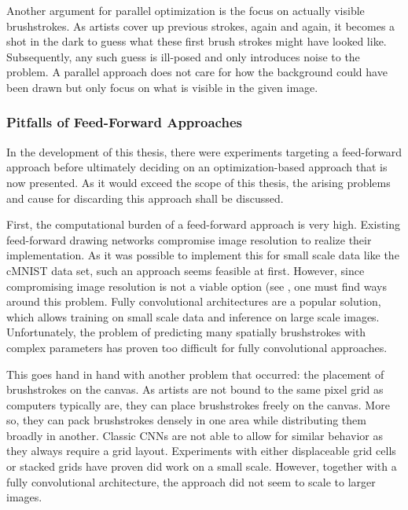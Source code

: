 Another argument for parallel optimization is the focus on actually visible brushstrokes.
As artists cover up previous strokes, again and again, it becomes a shot in the dark to guess what these first brush strokes might have looked like.
Subsequently, any such guess is ill-posed and only introduces noise to the problem.
A parallel approach does not care for how the background could have been drawn but only focus on what is visible in the given image.

\subsubsection{Pitfalls of Feed-Forward Approaches}

In the development of this thesis, there were experiments targeting a feed-forward approach before ultimately deciding on an optimization-based approach that is now presented.
As it would exceed the scope of this thesis, the arising problems and cause for discarding this approach shall be discussed.

First, the computational burden of a feed-forward approach is very high.
Existing feed-forward drawing networks compromise image resolution to realize their implementation.
As it was possible to implement this for small scale data like the cMNIST data set, such an approach seems feasible at first.  
However, since compromising image resolution is not a viable option (see , one must find ways around this problem.
Fully convolutional architectures are a popular solution, which allows training on small scale data and inference on large scale images.
Unfortunately, the problem of predicting many spatially brushstrokes with complex parameters has proven too difficult for fully convolutional approaches.

This goes hand in hand with another problem that occurred: the placement of brushstrokes on the canvas.
As artists are not bound to the same pixel grid as computers typically are, they can place brushstrokes freely on the canvas.
More so, they can pack brushstrokes densely in one area while distributing them broadly in another.
Classic CNNs are not able to allow for similar behavior as they always require a grid layout.
Experiments with either displaceable grid cells or stacked grids have proven did work on a small scale.
However, together with a fully convolutional architecture, the approach did not seem to scale to larger images.

